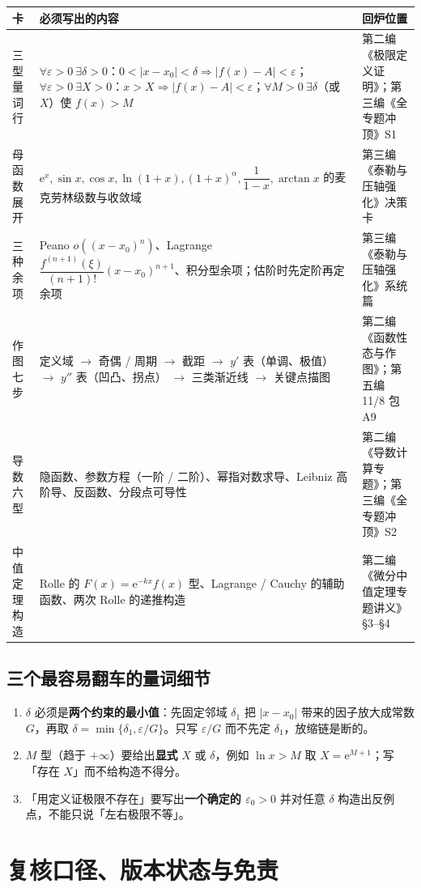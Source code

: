 \documentclass[11pt,a4paper]{ctexart}
\newcommand{\ee}{\mathrm{e}}
\newcommand{\eps}{\varepsilon}
\begin{document}
\begin{longtable}{@{}p{3.2cm}p{8.0cm}p{3.8cm}@{}}
\toprule
\textbf{卡} & \textbf{必须写出的内容} & \textbf{回炉位置} \\
\midrule
三型量词行 & $\forall\eps>0\ \exists\delta>0$：$0<|x-x_0|<\delta\Rightarrow|f(x)-A|<\eps$；$\forall\eps>0\ \exists X>0$：$x>X\Rightarrow|f(x)-A|<\eps$；$\forall M>0\ \exists\delta$（或 $X$）使 $f(x)>M$ & 第二编《极限定义证明》；第三编《全专题冲顶》S1 \\
母函数展开 & $\ee^x,\sin x,\cos x,\ln(1+x),(1+x)^\alpha,\dfrac1{1-x},\arctan x$ 的麦克劳林级数与收敛域 & 第三编《泰勒与压轴强化》决策卡 \\
三种余项 & Peano $o((x-x_0)^n)$、Lagrange $\dfrac{f^{(n+1)}(\xi)}{(n+1)!}(x-x_0)^{n+1}$、积分型余项；估阶时先定阶再定余项 & 第三编《泰勒与压轴强化》系统篇 \\
作图七步 & 定义域 $\to$ 奇偶 / 周期 $\to$ 截距 $\to$ $y'$ 表（单调、极值） $\to$ $y''$ 表（凹凸、拐点） $\to$ 三类渐近线 $\to$ 关键点描图 & 第二编《函数性态与作图》；第五编 11/8 包 A9 \\
导数六型 & 隐函数、参数方程（一阶 / 二阶）、幂指对数求导、Leibniz 高阶导、反函数、分段点可导性 & 第二编《导数计算专题》；第三编《全专题冲顶》S2 \\
中值定理构造 & Rolle 的 $F(x)=\ee^{-kx}f(x)$ 型、Lagrange / Cauchy 的辅助函数、两次 Rolle 的递推构造 & 第二编《微分中值定理专题讲义》\S3--\S4 \\
\bottomrule
\end{longtable}

\subsection{三个最容易翻车的量词细节}
\begin{enumerate}
\item $\delta$ 必须是\textbf{两个约束的最小值}：先固定邻域 $\delta_1$ 把 $|x-x_0|$ 带来的因子放大成常数 $G$，再取 $\delta=\min\{\delta_1,\eps/G\}$。只写 $\eps/G$ 而不先定 $\delta_1$，放缩链是断的。
\item $M$ 型（趋于 $+\infty$）要给出\textbf{显式} $X$ 或 $\delta$，例如 $\ln x>M$ 取 $X=\ee^{M+1}$；写「存在 $X$」而不给构造不得分。
\item 「用定义证极限不存在」要写出\textbf{一个确定的 $\eps_0>0$} 并对任意 $\delta$ 构造出反例点，不能只说「左右极限不等」。
\end{enumerate}

\newpage
\section{复核口径、版本状态与免责}
\end{document}
